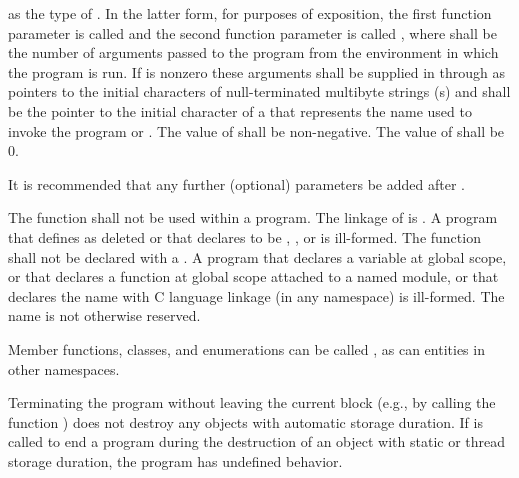 %
%
as the type of .
%
%
In the latter form, for purposes of exposition, the first function
parameter is called  and the second function parameter is
called , where  shall be the number of
arguments passed to the program from the environment in which the
program is run. If
 is nonzero these arguments shall be supplied in
 through  as pointers to the initial
characters of null-terminated multibyte strings (\ntmbs{}s)
and  shall be the pointer to
the initial character of a \ntmbs{} that represents the name used to
invoke the program or . The value of  shall be
non-negative. The value of  shall be 0. \begin{note} It
is recommended that any further (optional) parameters be added after
. \end{note}

\pnum
The function  shall not be used within
a program.
%
The linkage of  is
. A program that defines  as
deleted or that declares  to be
, , or  is ill-formed.
The  function shall not be declared with a
.
A program that declares a variable  at global scope,
or that declares a function  at global scope attached to a named module,
or that declares the name  with C language linkage (in any namespace)
is ill-formed.
The name  is
not otherwise reserved. \begin{example} Member functions, classes, and
enumerations can be called , as can entities in other
namespaces. \end{example}

\pnum
{}%
%
%
Terminating the program
without leaving the current block (e.g., by calling the function
) does not destroy any
objects with automatic storage duration. If
 is called to end a program during the destruction of
an object with static or thread storage duration, the program has undefined
behavior.

